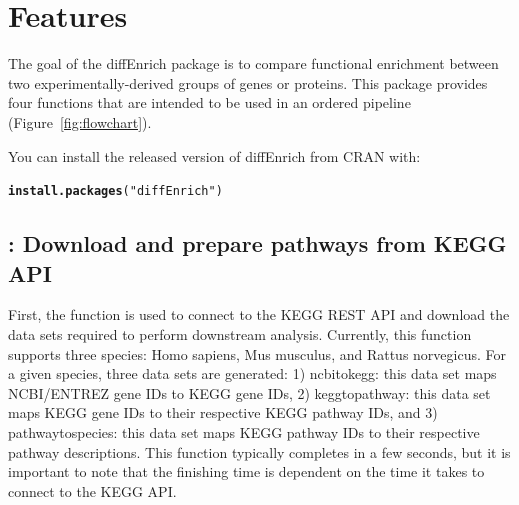 \documentclass[article]{jss}\usepackage[]{graphicx}\usepackage[]{color}
\makeatletter
\newcommand{\hlstr}[1]{\textcolor[rgb]{0.192,0.494,0.8}{#1}}%
\newcommand{\hlstd}[1]{\textcolor[rgb]{0.345,0.345,0.345}{#1}}%
\newcommand{\hlkwd}[1]{\textcolor[rgb]{0.737,0.353,0.396}{\textbf{#1}}}%
\newenvironment{kframe}{%
 \def\at@end@of@kframe{}%
 \ifinner\ifhmode%
  \def\at@end@of@kframe{\end{minipage}}%
  \begin{minipage}{\columnwidth}%
 \fi\fi%
 \def\FrameCommand##1{\hskip\@totalleftmargin \hskip-\fboxsep
 \colorbox{shadecolor}{##1}\hskip-\fboxsep
     \hskip-\linewidth \hskip-\@totalleftmargin \hskip\columnwidth}%
 \MakeFramed {\advance\hsize-\width
   \@totalleftmargin\z@ \linewidth\hsize
   \@setminipage}}%
 {\par\unskip\endMakeFramed%
 \at@end@of@kframe}
\newenvironment{knitrout}{}{} %
\makeatother
\begin{document}

\section[Features]{Features} \label{sec:feat}

The goal of the diffEnrich package is to compare functional enrichment between
two experimentally-derived groups of genes or proteins. This package provides
four functions that are intended to be used in an ordered pipeline
(Figure~\ref{fig:flowchart}).

\medskip

You can install the released version of diffEnrich from CRAN with:

\begin{knitrout}
\color{fgcolor}\begin{kframe}
\begin{alltt}
\hlkwd{install.packages}\hlstd{(}\hlstr{"diffEnrich"}\hlstd{)}
\end{alltt}
\end{kframe}
\end{knitrout}

\subsection{: Download and prepare pathways from KEGG API}

First, the  function is used to connect to the
KEGG REST API and download the data sets required to perform downstream
analysis. Currently, this function supports three species: Homo sapiens, Mus
musculus, and Rattus norvegicus. For a given species, three data sets are
generated: 1) ncbi\textunderscore to\textunderscore kegg: this data set maps NCBI/ENTREZ gene IDs to KEGG gene
IDs, 2) kegg\textunderscore to\textunderscore pathway: this data set maps KEGG gene IDs to their respective
KEGG pathway IDs, and 3) pathway\textunderscore to\textunderscore species: this data set maps KEGG pathway IDs
to their respective pathway descriptions. This function typically completes in a
few seconds, but it is important to note that the finishing time is dependent on
the time it takes to connect to the KEGG API.
\end{document}
